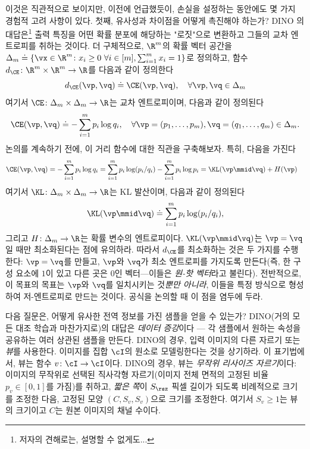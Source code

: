 \documentclass[../../book-main_ko.tex]{subfiles}
\begin{document}
이것은 직관적으로 보이지만, 이전에 언급했듯이, 손실을 설정하는 동안에도 몇 가지 경험적 고려 사항이 있다. 첫째, 유사성과 차이점을 어떻게 촉진해야 하는가? DINO \citep{caron2021emerging}의 대답은\footnote{저자의 견해로는, 설명할 수 없게도...} 출력 특징을 어떤 확률 분포에 해당하는 "로짓"으로 변환하고 그들의 교차 엔트로피를 취하는 것이다. 더 구체적으로, \(\R^{m}\)의 확률 벡터 공간을 \(\Delta_{m} \doteq \{\vx \in \R^{m} \colon x_{i} \geq 0\ \forall i \in [m], \sum_{i = 1}^{m}x_{i} = 1\}\)로 정의하고, 함수 \(d_{\CE} \colon \R^{m} \times \R^{m} \to \R\)를 다음과 같이 정의한다
 \begin{equation}\label{eq:cross_entropy_difference}
    d_{\CE}(\vp, \vq) \doteq \CE(\vp, \vq), \quad \forall \vp, \vq \in \Delta_{m}
 \end{equation}
 여기서 \(\CE \colon \Delta_{m} \times \Delta_{m} \to \R\)는 교차 엔트로피이며, 다음과 같이 정의된다
 \begin{equation}\label{eq:expts_def_ce}
    \CE(\vp, \vq) \doteq -\sum_{i = 1}^{m}p_{i}\log q_{i}, \quad \forall \vp = (p_{1}, \dots, p_{m}), \vq = (q_{1}, \dots, q_{m}) \in \Delta_{m}.
 \end{equation}
 논의를 계속하기 전에, 이 거리 함수에 대한 직관을 구축해보자. 특히, 다음을 가진다
 \begin{align}
    \CE(\vp, \vq)
    &= -\sum_{i = 1}^{m}p_{i}\log q_{i} = \sum_{i = 1}^{m}p_{i}\log(p_{i}/q_{i})
     - \sum_{i = 1}^{m}p_{i}\log p_{i} = \KL(\vp\mmid \vq) + H(\vp)
 \end{align}
 여기서 \(\KL \colon \Delta_{m} \times \Delta_{m} \to \R\)는 KL 발산이며, 다음과 같이 정의된다
 \begin{equation}
    \KL(\vp\mmid \vq) \doteq \sum_{i = 1}^{m}p_{i}\log(p_{i}/q_{i}),
 \end{equation}
 그리고 \(H \colon \Delta_{m} \to \R\)는 확률 변수의 엔트로피이다. \(\KL(\vp\mmid \vq)\)는 \(\vp = \vq\)일 때만 최소화된다는 점에 유의하라. 따라서 \(d_{\CE}\)를 최소화하는 것은 두 가지를 수행한다: \(\vp = \vq\)를 만들고, \(\vp\)와 \(\vq\)가 최소 엔트로피를 가지도록 만든다(즉, 한 구성 요소에 \(1\)이 있고 다른 곳은 \(0\)인 벡터—이들은 \textit{원-핫 벡터}라고 불린다). 전반적으로, 이 목표의 목표는 \(\vp\)와 \(\vq\)를 일치시키는 것\textit{뿐만 아니라}, 이들을 특정 방식으로 형성하여 저-엔트로피로 만드는 것이다. 공식을 논의할 때 이 점을 염두에 두라.

다음 질문은, 어떻게 유사한 전역 정보를 가진 샘플을 얻을 수 있는가? DINO(거의 모든 대조 학습과 마찬가지로)의 대답은 \textit{데이터 증강}이다 --- 각 샘플에서 원하는 속성을 공유하는 여러 상관된 샘플을 만든다. DINO의 경우, 입력 이미지의 다른 자르기 또는 \textit{뷰}를 사용한다. 이미지를 집합 \(\cI\)의 원소로 모델링한다는 것을 상기하라. 이 표기법에서, 뷰는 함수 \(v \colon \cI \to \cI\)이다. DINO의 경우, 뷰는 \textit{무작위 리사이즈 자르기}이다: 이미지의 무작위로 선택된 직사각형 자르기(이미지 전체 면적의 고정된 비율 \(p_{v} \in [0, 1]\)를 가짐)를 취하고, \textit{짧은 쪽}이 \(S_{\rsz}\) 픽셀 길이가 되도록 비례적으로 크기를 조정한 다음, 고정된 모양 \((C, S_{v}, S_{v})\)으로 크기를 조정한다. 여기서 \(S_{v} \geq 1\)는 뷰의 크기이고 \(C\)는 원본 이미지의 채널 수이다.
\end{document}
